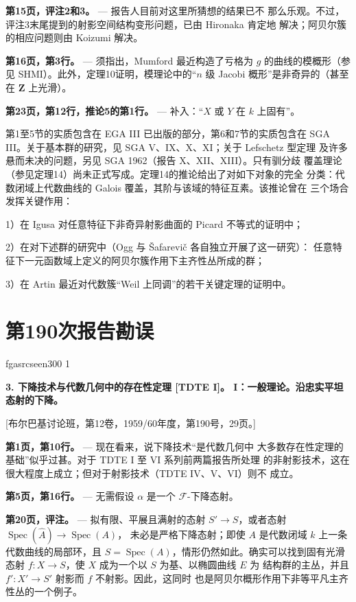\documentclass[12pt,twoside,openany]{book}
\numberwithin{equation}{section}
\newcommand{\fgaunitid}{unbound}
\newcommand{\src}[1]{%
  \phantomsection
  \hypertarget{src:\fgaunitid:#1}{}%
  \hypertarget{fga.\fgaunitid.p#1}{}%
  \ifcsname fgasrcseen#1\endcsname\else
    \expandafter\gdef\csname fgasrcseen#1\endcsname{1}%
    \hypertarget{src:#1}{}%
  \fi
  \marginpar{\raggedleft\footnotesize\sffamily #1}%
}
\newcommand{\sid}[1]{%
  \gdef\fgaunitid{#1}%
  \phantomsection\hypertarget{fga:#1}{}\hypertarget{fga.#1}{}%
}
\theoremstyle{plain}
\theoremstyle{definition}
\theoremstyle{remark}
\begin{document}
\noindent\textbf{第15页，评注2和3。} --- 报告人目前对这里所猜想的结果已不
那么乐观。不过，评注3末尾提到的射影空间结构变形问题，已由 Hironaka 肯定地
解决；阿贝尔簇的相应问题则由 Koizumi 解决。

\noindent\textbf{第16页，第3行。} --- 须指出，Mumford 最近构造了亏格为
$g$ 的曲线的模概形（参见 SHMI）。此外，定理10证明，模理论中的“$n$ 级
Jacobi 概形”是非奇异的（甚至在 $\mathbf Z$ 上光滑）。

\noindent\textbf{第23页，第12行，推论5的第1行。} --- 补入：“$X$ 或 $Y$
在 $k$ 上固有”。

第1至5节的实质包含在 EGA III 已出版的部分，第6和7节的实质包含在
SGA III。关于基本群的研究，见 SGA V、IX、X、XI；关于 Lefschetz 型定理
及许多悬而未决的问题，另见 SGA 1962（报告 X、XII、XIII）。只有驯分歧
覆盖理论（参见定理14）尚未正式写成。定理14的推论给出了对如下对象的完全
分类：代数闭域上代数曲线的 Galois 覆盖，其阶与该域的特征互素。该推论曾在
三个场合发挥关键作用：

1）在 Igusa 对任意特征下非奇异射影曲面的 Picard 不等式的证明中；

2）在对下述群的研究中（Ogg 与 Šafarevič 各自独立开展了这一研究）：
任意特征下一元函数域上定义的阿贝尔簇作用下主齐性丛所成的群；

3）在 Artin 最近对代数簇“Weil 上同调”的若干关键定理的证明中。

\par

\clearpage
\chapter*{第190次报告勘误}
\sid{e190}
\setcounter{footnote}{0}
\src{300}

\noindent\textbf{3. 下降技术与代数几何中的存在性定理 [TDTE I]。
I：一般理论。沿忠实平坦态射的下降。}

\begin{center}
[布尔巴基讨论班，第12卷，1959/60年度，第190号，29页。]
\end{center}

\noindent\textbf{第1页，第10行。} --- 现在看来，说下降技术“是代数几何中
大多数存在性定理的基础”似乎过甚。对于 TDTE I 至 VI 系列前两篇报告所处理
的非射影技术，这在很大程度上成立；但对于射影技术（TDTE IV、V、VI）则不
成立。

\noindent\textbf{第5页，第16行。} --- 无需假设 $\alpha$ 是一个
$\mathcal F$-下降态射。

\noindent\textbf{第20页，评注。} --- 拟有限、平展且满射的态射
$S'\longrightarrow S$，或者态射
$\operatorname{Spec}(\widehat A)\longrightarrow\operatorname{Spec}(A)$，
未必是严格下降态射；即使 $A$ 是代数闭域 $k$ 上一条代数曲线的局部环，且
$S=\operatorname{Spec}(A)$，情形仍然如此。确实可以找到固有光滑态射
$f:X\longrightarrow S$，使 $X$ 成为一个以 $S$ 为基、以椭圆曲线 $E$ 为
结构群的主丛，并且 $f':X'\longrightarrow S'$ 射影而 $f$ 不射影。因此，这同时
也是阿贝尔概形作用下非等平凡主齐性丛的一个例子。
\end{document}

